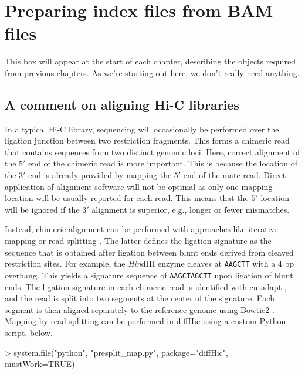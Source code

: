 \documentclass[12pt]{report}
\renewenvironment{Schunk}{\vspace{0pt}}{\vspace{0pt}}
\newcommand{\pkgname}{diffHic}
\newcommand{\code}[1]{{\small\texttt{#1}}}
\newenvironment{combox}
{ \begin{shaded}\begin{center}\begin{minipage}[t]{0.95\textwidth} }
{ \end{minipage}\end{center}\end{shaded} }
\begin{document}
\chapter{Preparing index files from BAM files}
\label{chap:prep} 

\begin{combox}
This box will appear at the start of each chapter, describing the objects required from previous chapters.
As we're starting out here, we don't really need anything.
\end{combox}

\section{A comment on aligning Hi-C libraries}
\label{sec:align}

In a typical Hi-C library, sequencing will occasionally be performed over the ligation junction between two restriction fragments.
This forms a chimeric read that contains sequences from two distinct genomic loci.
Here, correct alignment of the $5'$ end of the chimeric read is more important.
This is because the location of the $3'$ end is already provided by mapping the $5'$ end of the mate read.
Direct application of alignment software will not be optimal as only one mapping location will be usually reported for each read.
This means that the $5'$ location will be ignored if the $3'$ alignment is superior, e.g., longer or fewer mismatches.

Instead, chimeric alignment can be performed with approaches like iterative mapping \citep{imakaev2012iterative} or read splitting \citep{seitan2013cohesin}.
The latter defines the ligation signature as the sequence that is obtained after ligation between blunt ends derived from cleaved restriction sites.
For example, the \textit{Hin}dIII enzyme cleaves at \code{AAGCTT} with a 4 bp overhang.
This yields a signature sequence of \code{AAGCTAGCTT} upon ligation of blunt ends.
The ligation signature in each chimeric read is identified with cutadapt \citep{martin2011cutadapt}, and the read is split into two segments at the center of the signature.
Each segment is then aligned separately to the reference genome using Bowtie2 \citep{langmead2012bowtie}.
Mapping by read splitting can be performed in \pkgname{} using a custom Python script, below.

\begin{Schunk}
\begin{Sinput}
> system.file("python", "presplit_map.py", package="diffHic", mustWork=TRUE)
\end{Sinput}
\end{Schunk}
\end{document}
